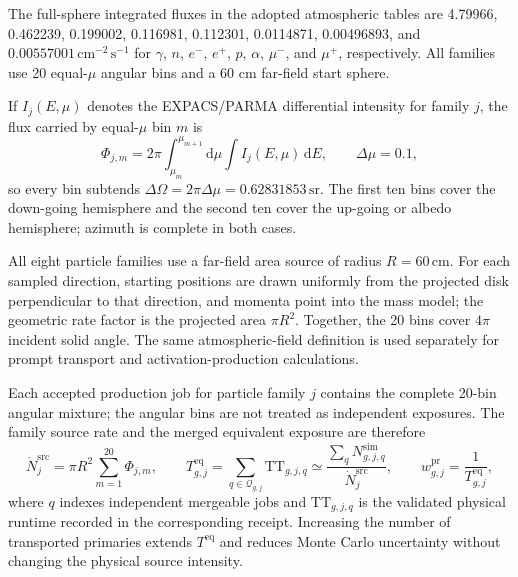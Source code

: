 \documentclass[11pt]{article}
\begin{document}
The full-sphere integrated fluxes in the adopted atmospheric tables are 4.79966, 0.462239, 0.199002,
0.116981, 0.112301, 0.0114871, 0.00496893, and
$0.00557001\,\mathrm{cm^{-2}\,s^{-1}}$ for $\gamma$, $n$, $e^-$, $e^+$, $p$,
$\alpha$, $\mu^-$, and $\mu^+$, respectively. All families use 20 equal-$\mu$
angular bins and a 60 cm far-field start sphere.



If $I_j(E,\mu)$ denotes the EXPACS/PARMA differential intensity for family $j$,
the flux carried by equal-$\mu$ bin $m$ is
\begin{equation}
 \Phi_{j,m}=2\pi\int_{\mu_m}^{\mu_{m+1}}\!\mathrm d\mu
             \int I_j(E,\mu)\,\mathrm dE,
 \qquad \Delta\mu=0.1,
 \label{eq:source_bin_flux}
\end{equation}
so every bin subtends $\Delta\Omega=2\pi\Delta\mu=0.62831853\,\mathrm{sr}$.
The first ten bins cover the down-going hemisphere and the second ten cover the
up-going or albedo hemisphere; azimuth is complete in both cases.

All eight particle families use a far-field area source of radius
$R=60\,\mathrm{cm}$. For each sampled direction, starting positions are drawn
uniformly from the projected disk perpendicular to that direction, and momenta
point into the mass model; the geometric rate factor is the projected area
$\pi R^2$. Together, the 20 bins cover $4\pi$ incident solid angle. The same
atmospheric-field definition is used separately for prompt transport and
activation-production calculations.

\begingroup

Each accepted production job for particle family $j$
contains the complete 20-bin angular mixture; the angular bins are not treated
as independent exposures. The family source rate and the merged equivalent
exposure are therefore
\begin{equation}
 \dot N^{\mathrm{src}}_{j}=\pi R^2\sum_{m=1}^{20}\Phi_{j,m},
 \qquad
 T^{\mathrm{eq}}_{g,j}=\sum_{q\in\mathcal Q_{g,j}}\mathrm{TT}_{g,j,q}
 \simeq
 \frac{\sum_q N^{\mathrm{sim}}_{g,j,q}}{\dot N^{\mathrm{src}}_{j}},
 \qquad
 w^{\mathrm{pr}}_{g,j}=\frac{1}{T^{\mathrm{eq}}_{g,j}},
 \label{eq:prompt_equivalent_exposure}
\end{equation}
where $q$ indexes independent mergeable jobs and $\mathrm{TT}_{g,j,q}$ is the
validated physical runtime recorded in the corresponding receipt. Increasing
the number of transported primaries extends $T^{\mathrm{eq}}$ and reduces Monte
Carlo uncertainty without changing the physical source intensity.
\end{document}
